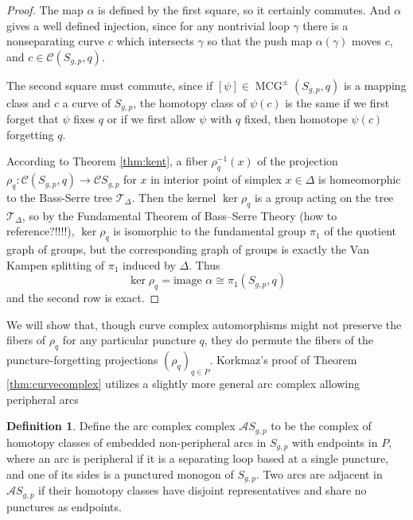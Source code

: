 \documentclass[11pt]{article}
\DeclareMathOperator{\mcg}{MCG}
\theoremstyle{remark}
\theoremstyle{definition}
\newtheorem{definition}[theorem]{Definition}
\begin{document}
\begin{proof}
  The map $\alpha$ is defined by the first square,
  so it certainly commutes.
  And $\alpha$
  gives a well defined injection,
  since for any nontrivial loop $\gamma$
  there is a nonseparating curve $c$
  which intersects $\gamma$ so that the push map
  $\alpha(\gamma)$ moves $c$, and $c \in \mathcal C (S_{g,p},q)$.

  The second square must commute,
  since if $[\psi] \in \mcg^\pm (S_{g,p},q)$
  is a mapping class and $c$ a curve of $S_{g,p}$,
  the homotopy class of $\psi(c)$ is the same if we first
  forget that $\psi$ fixes $q$ or if we first allow $\psi$ with
  $q$ fixed, then homotope $\psi(c)$ forgetting $q$.

  According to Theorem \ref{thm:kent},
  a fiber $\rho^{-1}_q(x)$ of the projection
  $\rho_q: \mathcal  C (S_{g,p},q) \to \mathcal C S_{g,p}$
  for $x$ in interior point of simplex $x\in \Delta$
  is homeomorphic to the Bass-Serre
  tree $\mathcal T_\Delta$.
  Then the kernel $\ker \rho_{q}$ is a
  group acting on the tree $\mathcal T_\Delta$,
  so by the
  Fundamental Theorem of Bass–Serre Theory
  (how to reference?!!!!),
  $\ker \rho_{q}$ is isomorphic to
  the fundamental group $\pi_1$ of the
  quotient graph of groups,
  but the corresponding graph of groups is
  exactly the Van Kampen splitting of $\pi_1$ induced by $\Delta$.
  Thus
  $$\ker \rho_{q} = \mbox{image } \alpha \cong \pi_1(S_{g,p},q)$$
  and the second row is exact.
\end{proof}

We will show that, though curve complex automorphisms might not
preserve the fibers of $\rho_q$ for any particular puncture $q$, they do permute the fibers
of the puncture-forgetting projections $(\rho_q)_{q \in P}$.
Korkmaz's proof of Theorem \ref{thm:curvecomplex}
utilizes a slightly more general arc complex
allowing peripheral arcs \cite{MR1696431}

\begin{definition}
  Define the arc complex complex
  $\mathcal A S_{g,p}$
  to be the complex of homotopy classes of embedded
  non-peripheral arcs in $S_{g,p}$ with endpoints in $P$,
  where an arc is peripheral if
  it is a separating loop based at a single puncture,
  and one of its sides is a punctured monogon of $S_{g,p}$.
  Two arcs are adjacent in
  $\mathcal A S_{g,p}$ if their homotopy classes
  have disjoint representatives and share no punctures as endpoints.
\end{definition}
\end{document}
